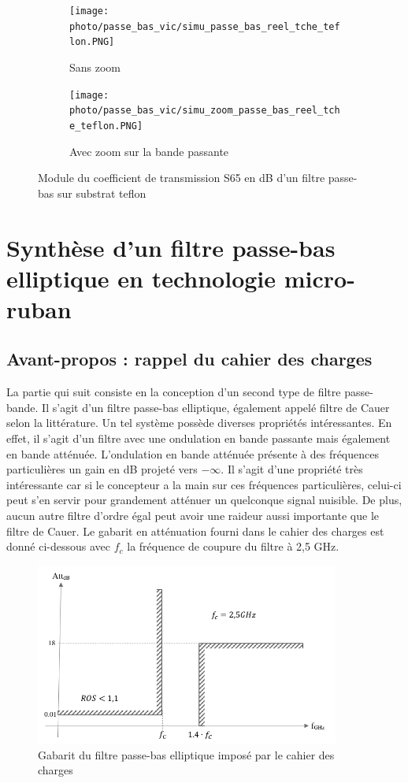 \documentclass[french]{article}
\begin{document}
\begin{figure}[H]
	\centering
	\begin{subfigure}[b]{0.49\textwidth}
		\texttt{[image: photo/passe\_bas\_vic/simu\_passe\_bas\_reel\_tche\_teflon.PNG]}
		\caption{Sans zoom}
		\label{fig:simu_passe_bas_reel_tche_teflon}
	\end{subfigure}
	\begin{subfigure}[b]{0.49\textwidth}
		\texttt{[image: photo/passe\_bas\_vic/simu\_zoom\_passe\_bas\_reel\_tche\_teflon.PNG]}
		\caption{Avec zoom sur la bande passante}
		\label{fig:simu_zoom_passe_bas_reel_tche_teflon}
	\end{subfigure}
	\caption{Module du coefficient de transmission S65 en dB d'un filtre passe-bas sur substrat teflon}
\end{figure}

\newpage

\section{Synthèse d'un filtre passe-bas elliptique en technologie micro-ruban}

\subsection{Avant-propos : rappel du cahier des charges}

La partie qui suit consiste en la conception d'un second type de filtre passe-bande. Il s'agit d'un filtre passe-bas elliptique, également appelé filtre de Cauer selon la littérature. Un tel système possède diverses propriétés intéressantes. En effet, il s'agit d'un filtre avec une ondulation en bande passante mais également en bande atténuée. L'ondulation en bande atténuée présente à des fréquences particulières un gain en dB projeté vers $-\infty$. Il s'agit d'une propriété très intéressante car si le concepteur a la main sur ces fréquences particulières, celui-ci peut s'en servir pour grandement atténuer un quelconque signal nuisible. De plus, aucun autre filtre d'ordre égal peut avoir une raideur aussi importante que le filtre de Cauer. 
Le gabarit en atténuation fourni dans le cahier des charges est donné ci-dessous avec $f_c$ la fréquence de coupure du filtre à 2,5 GHz.

\begin{figure}[H]
	\centering
	\includegraphics[width=10cm]{../3synthPBas/elliptique/gabarit_passe-bas_elliptique.png}
	\caption{Gabarit du filtre passe-bas elliptique imposé par le cahier des charges}
	\label{fig:gabarit_elliptique}
\end{figure}
\end{document}
